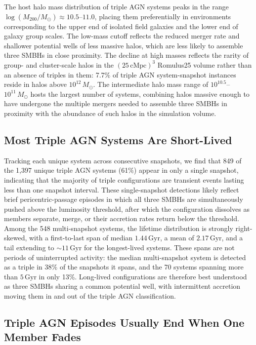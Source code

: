 \documentclass[twocolumn, 10pt]{article}
\begin{document}
The host halo mass distribution of triple AGN systems peaks in the
range $\log(M_{200}/M_\odot) \approx 10.5$--$11.0$, placing them
preferentially in environments corresponding to the upper end of
isolated field galaxies and the lower end of galaxy group scales.
The low-mass cutoff reflects the reduced merger rate and shallower
potential wells of less massive halos, which are less likely to
assemble three SMBHs in close proximity. The decline at high masses
reflects the rarity of group- and cluster-scale halos in the
$(25\,\mathrm{cMpc})^3$ Romulus25 volume rather than an absence of
triples in them: 7.7\% of triple AGN system-snapshot instances reside
in halos above $10^{12}\,M_\odot$. The intermediate halo mass range of
$10^{10.5}$--$10^{11}\,M_\odot$ hosts the largest number of systems,
combining halos massive enough to have undergone the multiple mergers
needed to assemble three SMBHs in proximity with the abundance of such
halos in the simulation volume.

\subsection*{Most Triple AGN Systems Are Short-Lived}

Tracking each unique system across consecutive snapshots, we find
that 849 of the 1,397 unique triple AGN systems (61\%) appear in
only a single snapshot, indicating that the majority of triple
configurations are transient events lasting less than one snapshot
interval. These single-snapshot detections likely reflect brief
pericentric-passage episodes in which all three SMBHs are
simultaneously pushed above the luminosity threshold, after which
the configuration dissolves as members separate, merge, or their
accretion rates return below the threshold. Among the 548
multi-snapshot systems, the lifetime distribution is strongly
right-skewed, with a first-to-last span of median $1.44\,\mathrm{Gyr}$, a mean of
$2.17\,\mathrm{Gyr}$, and a tail extending to $\sim 11\,\mathrm{Gyr}$
for the longest-lived systems. These spans are not periods of
uninterrupted activity: the median multi-snapshot system is detected
as a triple in 38\% of the snapshots it spans, and the 70 systems
spanning more than $5\,\mathrm{Gyr}$ in only 13\%. Long-lived
configurations are therefore best understood as three SMBHs sharing a
common potential well, with intermittent accretion moving them in and
out of the triple AGN classification.

\subsection*{Triple AGN Episodes Usually End When One Member Fades}
\end{document}
